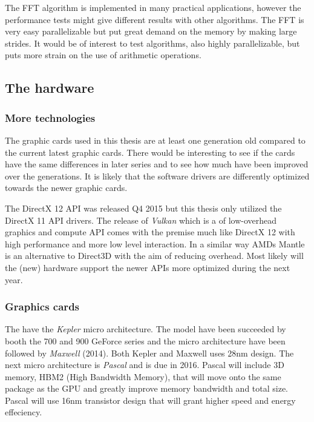 The FFT algorithm is implemented in many practical applications, however the performance tests might give different results with other algorithms. The FFT is very easy parallelizable but put great demand on the memory by making large strides. It would be of interest to test algorithms, also highly parallelizable, but puts more strain on the use of arithmetic operations.

\subsection{The hardware}

\subsubsection{More technologies}

The graphic cards used in this thesis are at least one generation old compared to the current latest graphic cards. There would be interesting to see if the cards have the same differences in later series and to see how much have been improved over the generations. It is likely that the software drivers are differently optimized towards the newer graphic cards.

The DirectX 12 API was released Q4 2015 but this thesis only utilized the DirectX 11 API drivers. The release of \textit{Vulkan} which is a of low-overhead graphics and compute API comes with the premise much like DirectX 12 with high performance and more low level interaction. In a similar way AMDs Mantle is an alternative to Direct3D with the aim of reducing overhead. Most likely will the (new) hardware support the newer APIs more optimized during the next year.

\subsubsection{Graphics cards}

The {\NVCARD} have the \textit{Kepler} micro architecture. The model have been succeeded by booth the 700 and 900 GeForce series and the micro architecture have been followed by \textit{Maxwell} (2014). Both Kepler and Maxwell uses 28nm design. The next micro architecture is \textit{Pascal} and is due in 2016. Pascal will include 3D memory, HBM2 (High Bandwidth Memory), that will move onto the same package as the GPU and greatly improve memory bandwidth and total size. Pascal will use 16nm transistor design that will grant higher speed and energy effeciency.

